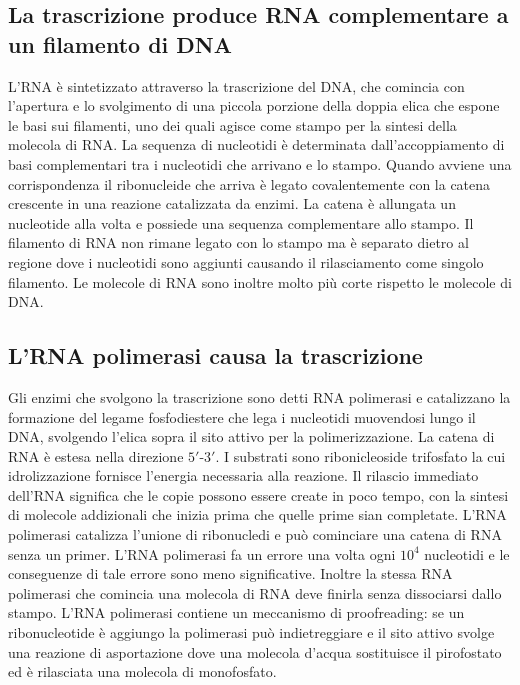 \subsection{La trascrizione produce RNA complementare a un filamento di DNA}
L'RNA \`e sintetizzato attraverso la trascrizione del DNA, che comincia con l'apertura e lo svolgimento di una piccola porzione della doppia elica che espone le basi sui filamenti, uno
dei quali agisce come stampo per la sintesi della molecola di RNA. La sequenza di nucleotidi \`e determinata dall'accoppiamento di basi complementari tra i nucleotidi che arrivano e lo
stampo. Quando avviene una corrispondenza il ribonucleide che arriva \`e legato covalentemente con la catena crescente in una reazione catalizzata da enzimi. La catena \`e allungata un
nucleotide alla volta e possiede una sequenza complementare allo stampo. Il filamento di RNA non rimane legato con lo stampo ma \`e separato dietro al regione dove i nucleotidi sono
aggiunti causando il rilasciamento come singolo filamento. Le molecole di RNA sono inoltre molto pi\`u corte rispetto le molecole di DNA. 
\subsection{L'RNA polimerasi causa la trascrizione}
Gli enzimi che svolgono la trascrizione sono detti RNA polimerasi e catalizzano la formazione del legame fosfodiestere che lega i nucleotidi muovendosi lungo il DNA, svolgendo l'elica
sopra il sito attivo per la polimerizzazione. La catena di RNA \`e estesa nella direzione $5'$-$3'$. I substrati sono ribonicleoside trifosfato la cui idrolizzazione fornisce l'energia
necessaria alla reazione. Il rilascio immediato dell'RNA significa che le copie possono essere create in poco tempo, con la sintesi di molecole addizionali che inizia prima che quelle
prime sian completate. L'RNA polimerasi catalizza l'unione di ribonucledi e pu\`o cominciare una catena di RNA senza un primer. L'RNA polimerasi fa un errore una volta ogni $10^4$ 
nucleotidi e le conseguenze di tale errore sono meno significative. Inoltre la stessa RNA polimerasi che comincia una molecola di RNA deve finirla senza dissociarsi dallo stampo. L'RNA
polimerasi contiene un meccanismo di proofreading: se un ribonucleotide \`e aggiungo la polimerasi pu\`o indietreggiare e il sito attivo svolge una reazione di asportazione dove una
molecola d'acqua sostituisce il pirofostato ed \`e rilasciata una molecola di monofosfato. 
